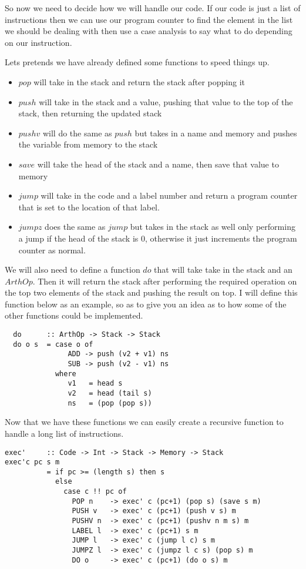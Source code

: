 So now we need to decide how we will handle our code. If our code is just a list of instructions then we can use our program counter to find the element in the list we should be dealing with then use a case analysis to say what to do depending on our instruction.

Lets pretends we have already defined some functions to speed things up. 
\begin{itemize}
\item $pop$ will take in the stack and return the stack after popping it
\item $push$ will take in the stack and a value, pushing that value to the top of the stack, then returning the updated stack
\item $pushv$ will do the same as $push$ but takes in a name and memory and pushes the variable from memory to the stack
\item $save$ will take the head of the stack and a name, then save that value to memory
\item $jump$ will take in the code and a label number and return a program counter that is set to the location of that label.
\item $jumpz$ does the same as $jump$ but takes in the stack as well only performing a jump if the head of the stack is 0, otherwise it just increments the program counter as normal.
\end{itemize}

 
We will also need to define a function $do$ that will take take in the stack and an $ArthOp$. Then it will return the stack after performing the required operation on the top two elements of the stack and pushing the result on top. I will define this function below as an example, so as to give you an idea as to how some of the other functions could be implemented.

\begin{lstlisting}
  do      :: ArthOp -> Stack -> Stack
  do o s  = case o of
               ADD -> push (v2 + v1) ns 
               SUB -> push (v2 - v1) ns
            where 
               v1   = head s
               v2   = head (tail s)
               ns   = (pop (pop s)) 
\end{lstlisting}


Now that we have these functions we can easily create a recursive function to handle a long list of instructions. 

\begin{lstlisting}[basicstyle=\ttfamily\small]
exec'     :: Code -> Int -> Stack -> Memory -> Stack
exec'c pc s m 
          = if pc >= (length s) then s 
            else 
              case c !! pc of
                POP n    -> exec' c (pc+1) (pop s) (save s m)
                PUSH v   -> exec' c (pc+1) (push v s) m
                PUSHV n  -> exec' c (pc+1) (pushv n m s) m
                LABEL l  -> exec' c (pc+1) s m
                JUMP l   -> exec' c (jump l c) s m
                JUMPZ l  -> exec' c (jumpz l c s) (pop s) m
                DO o     -> exec' c (pc+1) (do o s) m               
\end{lstlisting}

